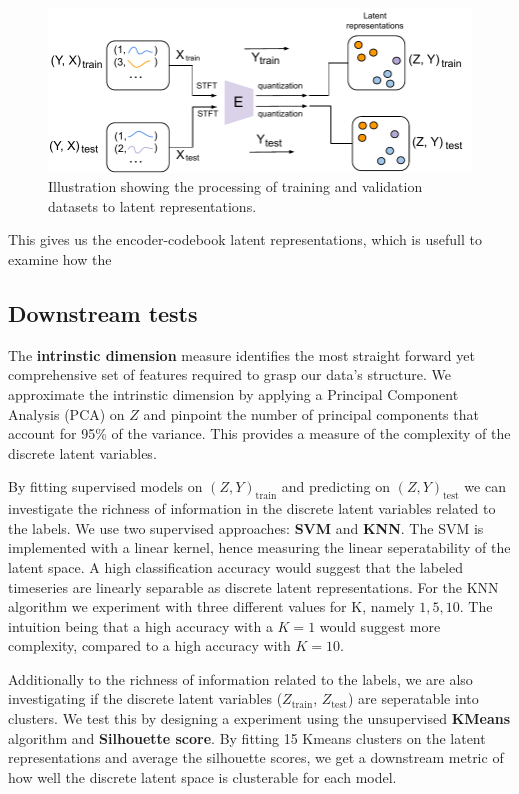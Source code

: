 \begin{figure}[H]
    \includegraphics[scale=0.8]{figures/figure-pdf/Downstreams.pdf}
    \caption{Illustration showing the processing of training and validation datasets to latent representations.}
    \label{fig:latents}
\end{figure}

This gives us the encoder-codebook latent representations, which is usefull to examine how the 

\subsection{Downstream tests}
The \textbf{intrinstic dimension} measure identifies the most straight forward yet comprehensive set of features required to grasp our data's structure. We approximate the intrinstic dimension by applying a Principal Component Analysis (PCA) on $Z$ and pinpoint the number of principal components that account for 95\%
of the variance. This provides a measure of the complexity of the discrete latent variables. 

By fitting supervised models on $(Z, Y)_\text{train}$ and predicting on $(Z, Y)_\text{test}$ we can investigate the richness of information in the discrete latent variables related to the labels.
We use two supervised approaches: \textbf{SVM} and \textbf{KNN}. The SVM is implemented with a linear kernel, hence measuring the linear seperatability of the latent space. A high classification accuracy would suggest that the labeled timeseries are linearly separable as discrete latent representations. 
For the KNN algorithm we experiment with three different values for K, namely $1, 5, 10$. The intuition being that a high accuracy with a $K=1$ would suggest more complexity, compared to a high accuracy with $K=10$.

Additionally to the richness of information related to the labels, we are also investigating if the discrete latent variables ($Z_\text{train}$, $Z_\text{test}$) are seperatable into clusters. We test this by designing a experiment using the unsupervised \textbf{KMeans} algorithm and \textbf{Silhouette score}.
By fitting 15 Kmeans clusters on the latent representations  and average the silhouette scores, we get a downstream metric of how well the discrete latent space is clusterable for each model. 

